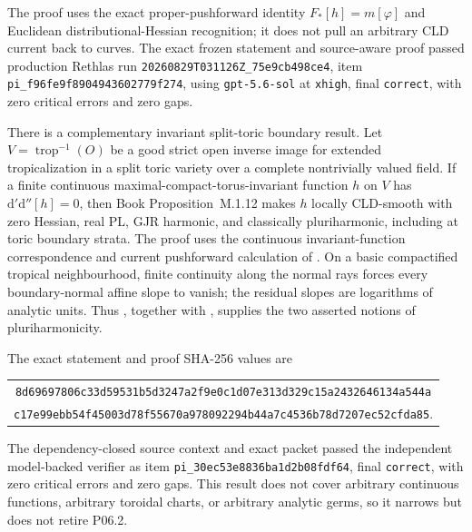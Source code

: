 \documentclass[11pt,a4paper]{article}
\theoremstyle{definition}
\theoremstyle{remark}
\newcommand{\rd}{\mathrm d}
\newcommand{\dprime}{\rd'}
\newcommand{\ddprime}{\rd''}
\newcommand{\dprimeddprime}{\dprime\ddprime}
\begin{document}
The proof uses the exact proper-pushforward identity
\(F_*[h]=m[\varphi]\) and Euclidean distributional-Hessian recognition; it does
not pull an arbitrary CLD current back to curves.  The exact frozen statement
and source-aware proof passed production Rethlas run
\nolinkurl{20260829T031126Z_75e9cb498ce4}, item
\nolinkurl{pi_f96fe9f8904943602779f274}, using
\texttt{gpt-5.6-sol} at \texttt{xhigh}, final \texttt{correct}, with zero
critical errors and zero gaps.

There is a complementary invariant split-toric boundary result.  Let
\(V=\operatorname{trop}^{-1}(O)\) be a good strict open inverse image for
extended tropicalization in a split toric variety over a complete
nontrivially valued field.  If a finite continuous
maximal-compact-torus-invariant function \(h\) on \(V\) has
\(\dprimeddprime[h]=0\), then
Book Proposition~M.1.12
makes \(h\) locally CLD-smooth with zero Hessian, real PL, GJR harmonic, and
classically pluriharmonic, including at toric boundary strata.  The proof
uses the continuous invariant-function correspondence and current
pushforward calculation of \cite[(5.5) and Proposition~5.3.10(iv)]{BGJKK25}.
On a basic compactified tropical neighbourhood, finite continuity along the
normal rays forces every boundary-normal affine slope to vanish; the residual
slopes are logarithms of analytic units.  Thus
\cite[Proposition~4.2 and Theorem~4.3]{GR25Classical}, together with
\cite[Definition~7.2]{GJR26}, supplies the two asserted notions of
pluriharmonicity.

The exact statement and proof SHA-256 values are
\begin{center}
\small
\begin{tabular}{@{}c@{}}
\nolinkurl{8d69697806c33d59531b5d3247a2f9e0c1d07e313d329c15a2432646134a544a}\\
\nolinkurl{c17e99ebb54f45003d78f55670a978092294b44a7c4536b78d7207ec52cfda85}.
\end{tabular}
\end{center}
The dependency-closed source context and exact packet passed the independent
model-backed verifier as item
\nolinkurl{pi_30ec53e8836ba1d2b08fdf64}, final \texttt{correct}, with zero
critical errors and zero gaps.  This result does not cover arbitrary
continuous functions, arbitrary toroidal charts, or arbitrary analytic
germs, so it narrows but does not retire P06.2.
\end{document}
